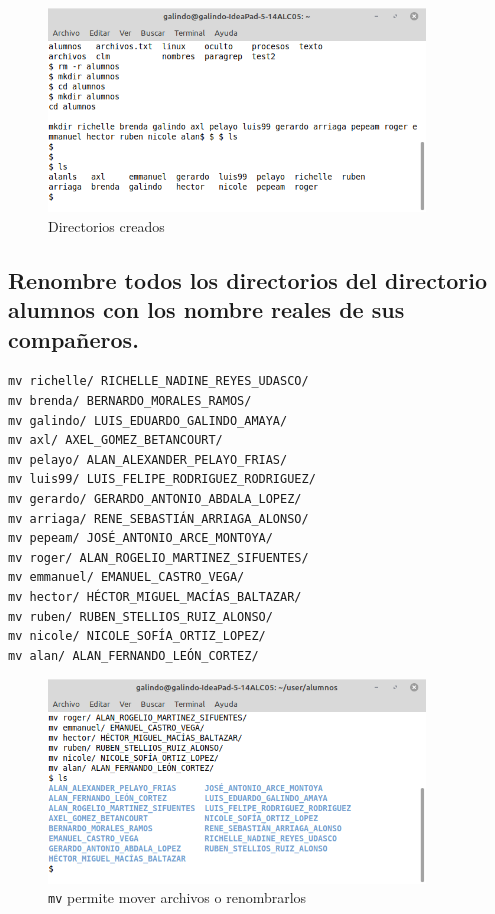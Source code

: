 \documentclass[11pt]{article}
\begin{document}
\begin{figure}[htbp]
\centering
\includegraphics[width=10cm]{img/11.png}
\caption{Directorios creados}
\end{figure}

\subsection{Renombre todos los directorios del directorio alumnos con los nombre reales de sus compañeros.}
\label{sec:org536b65f}
\begin{verbatim}
mv richelle/ RICHELLE_NADINE_REYES_UDASCO/
mv brenda/ BERNARDO_MORALES_RAMOS/
mv galindo/ LUIS_EDUARDO_GALINDO_AMAYA/
mv axl/ AXEL_GOMEZ_BETANCOURT/
mv pelayo/ ALAN_ALEXANDER_PELAYO_FRIAS/
mv luis99/ LUIS_FELIPE_RODRIGUEZ_RODRIGUEZ/
mv gerardo/ GERARDO_ANTONIO_ABDALA_LOPEZ/
mv arriaga/ RENE_SEBASTIÁN_ARRIAGA_ALONSO/
mv pepeam/ JOSÉ_ANTONIO_ARCE_MONTOYA/
mv roger/ ALAN_ROGELIO_MARTINEZ_SIFUENTES/
mv emmanuel/ EMANUEL_CASTRO_VEGA/
mv hector/ HÉCTOR_MIGUEL_MACÍAS_BALTAZAR/
mv ruben/ RUBEN_STELLIOS_RUIZ_ALONSO/
mv nicole/ NICOLE_SOFÍA_ORTIZ_LOPEZ/
mv alan/ ALAN_FERNANDO_LEÓN_CORTEZ/
\end{verbatim}


\begin{figure}[htbp]
\centering
\includegraphics[width=10cm]{img/12.png}
\caption[\texttt{mv}]{\texttt{mv} permite mover archivos o renombrarlos}
\end{figure}
\end{document}
